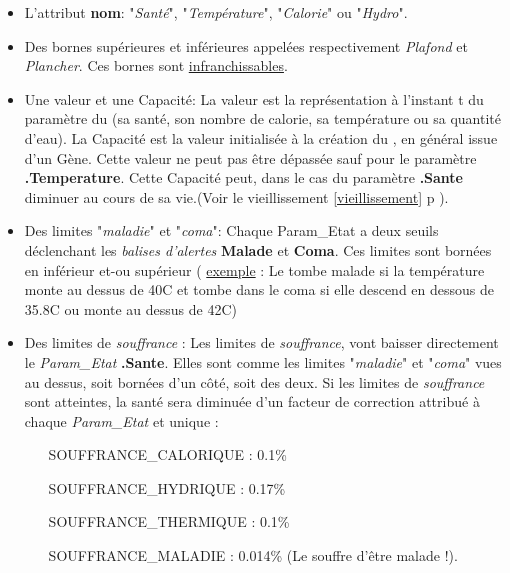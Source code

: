 \documentclass[french]{report}
\begin{document}
\begin{itemize}
	\item L'attribut \textbf{nom}: "\textit{Santé}", "\textit{Température}", "\textit{Calorie}" ou "\textit{Hydro}".\\
	
	\item Des bornes supérieures et inférieures appelées respectivement \textit{Plafond} et \textit{Plancher}. Ces bornes sont \underline{infranchissables}.\\
	
	\item Une valeur et une Capacité: La valeur est la représentation à l'instant t du paramètre du \CoCiX (sa santé, son nombre de calorie, sa température ou sa quantité d'eau). La Capacité est la valeur initialisée à la création du \CoCiX, en général issue d'un Gène. Cette valeur ne peut pas être  dépassée sauf pour le paramètre \textbf{.Temperature}. Cette Capacité peut, dans le cas du paramètre \textbf{.Sante} diminuer au cours de sa vie.(Voir le vieillissement \ref{vieillissement} p \pageref{vieillissement}).\\
	
	\item Des limites "\textit{maladie}" et "\textit{coma}": Chaque Param\_Etat a deux seuils déclenchant les \textit{balises d'alertes} \textbf{Malade} et \textbf{Coma}. Ces limites sont  bornées en inférieur et-ou supérieur ( \underline{exemple} : Le \CoCiX tombe malade si la température monte au dessus de 40\degres C et tombe dans le coma si elle descend en dessous de 35.8\degres C ou  monte au dessus de 42\degres C)\\
	
	\item Des limites de \textit{souffrance} : Les limites de \textit{souffrance}, vont baisser directement le \textit{Param\_Etat} \textbf{.Sante}. Elles sont comme les limites "\textit{maladie}" et "\textit{coma}" vues au dessus, soit bornées d'un côté, soit des deux. Si les limites de \textit{souffrance} sont atteintes, la santé sera diminuée d'un facteur de correction attribué à chaque \textit{Param\_Etat} et unique :\label{souffrances}\\
	\begin{itemize}
		\item[SOUFFRANCE\_CALORIQUE] : 0.1\%
		\item[SOUFFRANCE\_HYDRIQUE] : 0.17\%
		\item[SOUFFRANCE\_THERMIQUE] : 0.1\%
		\item[SOUFFRANCE\_MALADIE] : 0.014\% (Le \CoCiX souffre d'être malade !).\\
	\end{itemize}
	
\end{itemize}
\end{document}
